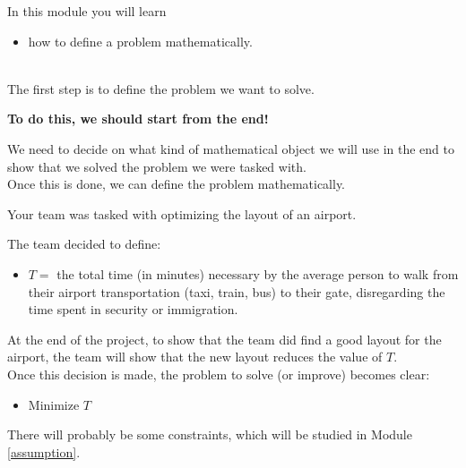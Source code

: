 	In this module you will learn
	\begin{itemize}
		\item how to define a problem mathematically.
	\end{itemize}

\hfill \\


The first step is to define the problem we want to solve.

\textbf{To do this, we should start from the end! }

We need to decide on what kind of mathematical object we will use in the end to show that we solved the problem we were tasked with. \\


Once this is done, we can define the problem mathematically. 

\begin{example}
	Your team was tasked with optimizing the layout of an airport. 

	The team decided to define:
	\begin{itemize}
		\item $T = $ the total time (in minutes) necessary by the average person to walk from their airport transportation (taxi, train, bus) to their gate, disregarding the time spent in security or immigration.
	\end{itemize}

	At the end of the project, to show that the team did find a good layout for the airport, the team will show that the new layout reduces the value of $T$. \\

	Once this decision is made, the problem to solve (or improve) becomes clear:
	
	\begin{itemize}
		\item Minimize $T$
	\end{itemize}

	There will probably be some constraints, which will be studied in Module \ref{assumption}.

\end{example}
